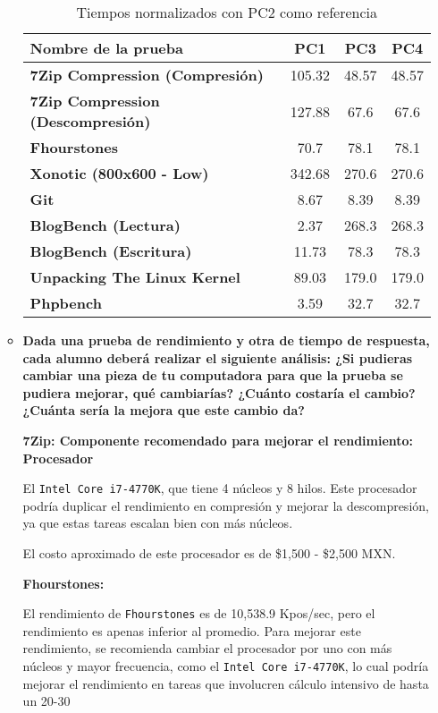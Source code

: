 \documentclass[12pt]{article}
\newcommand{\pl}[1]{\item \textbf{ #1 }}
\begin{document}
\begin{enumerate}[(3.2.1)]
\begin{itemize}
 \begin{table}[ht]
\centering
\begin{tabular}{|l|c|c|c|}
\hline
\textbf{Nombre de la prueba} & \textbf{PC1} & \textbf{PC3} & \textbf{PC4} \\
\hline
\textbf{7Zip Compression (Compresión)} & 105.32 & 48.57 & 48.57 \\
\hline
\textbf{7Zip Compression (Descompresión)} & 127.88 & 67.6 & 67.6 \\
\hline
\textbf{Fhourstones} & 70.7 & 78.1 & 78.1 \\
\hline
\textbf{Xonotic (800x600 - Low)} & 342.68 & 270.6 & 270.6 \\
\hline
\textbf{Git} & 8.67 & 8.39 & 8.39 \\
\hline
\textbf{BlogBench (Lectura)} & 2.37 & 268.3 & 268.3 \\
\hline
\textbf{BlogBench (Escritura)} & 11.73 & 78.3 & 78.3 \\
\hline
\textbf{Unpacking The Linux Kernel} & 89.03 & 179.0 & 179.0 \\
\hline
\textbf{Phpbench} & 3.59 & 32.7 & 32.7 \\
\hline
\end{tabular}
\caption{Tiempos normalizados con PC2 como referencia}
\end{table}


    \pl{Dada una prueba de rendimiento y otra de tiempo de respuesta, cada alumno deberá realizar el siguiente análisis: ¿Si pudieras cambiar una pieza de tu computadora para que la prueba se pudiera mejorar, qué cambiarías? ¿Cuánto costaría el cambio? ¿Cuánta sería la mejora que este cambio da?}

    \textbf{7Zip: Componente recomendado para mejorar el rendimiento: Procesador}

El \texttt{Intel Core i7-4770K}, que tiene 4 núcleos y 8 hilos. Este procesador podría duplicar el rendimiento en compresión y mejorar la descompresión, ya que estas tareas escalan bien con más núcleos.

El costo aproximado de este procesador es de \$1,500 - \$2,500 MXN.


\textbf{Fhourstones:}

El rendimiento de \texttt{Fhourstones} es de 10,538.9 Kpos/sec, pero el rendimiento es apenas inferior al promedio. Para mejorar este rendimiento, se recomienda cambiar el procesador por uno con más núcleos y mayor frecuencia, como el \texttt{Intel Core i7-4770K}, lo cual podría mejorar el rendimiento en tareas que involucren cálculo intensivo de hasta un 20-30%


\end{itemize}
\end{enumerate}
\end{document}
